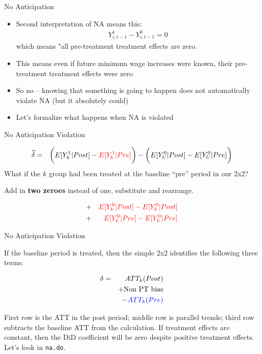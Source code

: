 \documentclass{beamer}
\begin{document}
\begin{frame}{No Anticipation}

\begin{itemize}
\item Second interpretation of NA means this:
	\begin{eqnarray*}
	Y^1_{i,t-1} - Y^0_{i,t-1}=0
	\end{eqnarray*}which means "all pre-treatment treatment effects are zero.
\item This means even if future minimum wage increases were known, their pre-treatment treatment effects were zero
\item So no -- knowing that something is going to happen does not automatically violate NA (but it absolutely could)
\item Let's formalize what happens when NA is violated

\end{itemize}

\end{frame}




\begin{frame}{No Anticipation Violation}


\begin{eqnarray*}
\widehat{\delta} &=& \bigg ( E[Y^1_k|Post] - \textcolor{red}{E[Y^1_k|Pre]} \bigg ) - \bigg ( E[Y^0_U | Post ] - E[ Y^0_U | Pre] \bigg) \\
\end{eqnarray*}What if the $k$ group had been treated at the baseline ``pre'' period in our 2x2?

\bigskip

Add in \textbf{two zeroes} instead of one, substitute and rearrange.

\begin{eqnarray*}
&+& \textcolor{red}{E[Y^0_k|Post] - E[Y^0_k|Post]} \\
&+& \textcolor{red}{E[Y^0_k|Pre] - E[Y^0_k|Pre]}
\end{eqnarray*}

\end{frame}

\begin{frame}{No Anticipation Violation}

If the baseline period is treated, then the simple 2x2 identifies the following three terms:

\begin{eqnarray*}
\delta &=& ATT_k(Post) \\&&+ \text{Non PT bias} \\&&- \textcolor{blue}{ATT_k(Pre)}
\end{eqnarray*}

First row is the ATT in the post period; middle row is parallel trends; third row subtracts the baseline ATT from the calculation. If treatment effects are constant, then the DiD coefficient will be zero despite positive treatment effects.  Let's look in \texttt{na.do}.

\end{frame}
\end{document}
